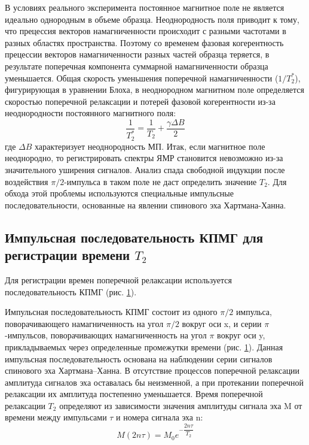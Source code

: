 В условиях реального эксперимента постоянное магнитное поле не является идеально однородным в объеме образца. 
Неоднородность поля приводит к тому, что прецессия векторов намагниченности происходит с разными частотами в разных областях пространства. 
Поэтому со временем фазовая когерентность прецессии векторов намагниченности разных частей образца теряется, в результате поперечная компонента суммарной намагниченности образца уменьшается. 
Общая скорость уменьшения поперечной намагниченности ($ 1/T_2^* $), фигурирующая в уравнении Блоха, в неоднородном магнитном поле определяется скоростью поперечной релаксации и потерей фазовой когерентности из-за неоднородности постоянного магнитного поля:
\begin{equation}
\label{T2*_def}
\dfrac{1}{T_2^*} = \dfrac{1}{T_2} + \dfrac{\gamma \Delta B}{2}
\end{equation}
где $ \Delta B $ характеризует неоднородность МП.
Итак, если магнитное поле неоднородно, то регистрировать спектры ЯМР становится невозможно из-за значительного уширения сигналов. Анализ спада свободной индукции после воздействия $ \pi /2 $-импульса в таком поле не даст определить значение $ T_2 $. Для обхода этой проблемы используются специальные импульсные последовательности, основанные на явлении спинового эха Хартмана-Ханна.

\subsection{Импульсная последовательность КПМГ для регистрации времени $ T_2 $}
Для регистрации времен поперечной релаксации используется последовательность КПМГ (рис. \ref{fig:2019-02-11}).
\begin{figure}
	\centering
	\caption{}
	\label{fig:2019-02-11}
\end{figure}
Импульсная последовательность КПМГ состоит из одного $\pi /2$ импульса, поворачивающего намагниченность на угол $\pi /2$ вокруг оси x, и серии $\pi$-импульсов, поворачивающих намагниченность на угол $\pi$ вокруг оси y, прикладываемых через определенные промежутки времени (рис. \ref{fig:2019-02-11}). Данная импульсная последовательность основана на наблюдении серии сигналов спинового эха Хартмана–Ханна. В отсутствие процессов поперечной релаксации амплитуда сигналов эха оставалась бы неизменной, а при протекании поперечной релаксации их амплитуда постепенно уменьшается. Время поперечной релаксации $T_2$ определяют из зависимости значения амплитуды сигнала эха M от времени между импульсами $\tau$ и номера сигнала эха n:  
\begin{equation}
\label{eq:T2-def}
M(2n\tau)=M_0 e^{-\dfrac{2n\tau}{T_2}}
\end{equation}

